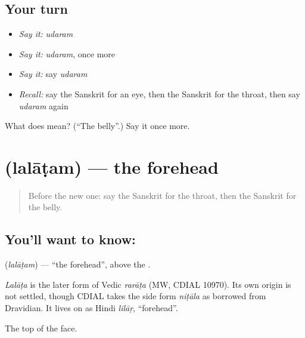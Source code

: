 \subsection*{Your turn}
\begin{itemize}
\raggedright
  \item \emph{Say it:} \emph{udaram}
  \item \emph{Say it:} \emph{udaram}, once more
  \item \emph{Say it:} say \emph{udaram}
  \item \emph{Recall:} say the Sanskrit for an eye, then the Sanskrit for the throat, then say \emph{udaram} again
\end{itemize}

\begin{tcolorbox}[breakable,colback=teal!4,colframe=teal!35!black,title={Before you move on}]
What does  mean? (\textquotedblleft{}The belly\textquotedblright{}.) Say it once more.
\end{tcolorbox}
\section[\texorpdfstring{\sk{ललाटम्} (lalāṭam)}{ललाटम् (lalāṭam)}]{ (lalāṭam) — the forehead}

\label{lesson:SA-C69-forehead}



\begin{quote}
Before the new one: say the Sanskrit for the throat, then the Sanskrit for the belly.
\end{quote}

\subsection*{You'll want to know: }
\textbf{} (\emph{lalāṭam}) — \textquotedblleft{}the forehead\textquotedblright{}, above the \textbf{}.

\begin{cousinweb}
\emph{Lalāṭa} is the later form of Vedic \emph{rarāṭa} (MW, CDIAL 10970). Its own origin is not settled, though CDIAL takes the side form \emph{niṭāla} as borrowed from Dravidian. It lives on as Hindi \emph{lilāṛ}, \textquotedblleft{}forehead\textquotedblright{}.
\end{cousinweb}

\begin{grammarlens}[title={What you've built}]
The top of the face.
\end{grammarlens}

